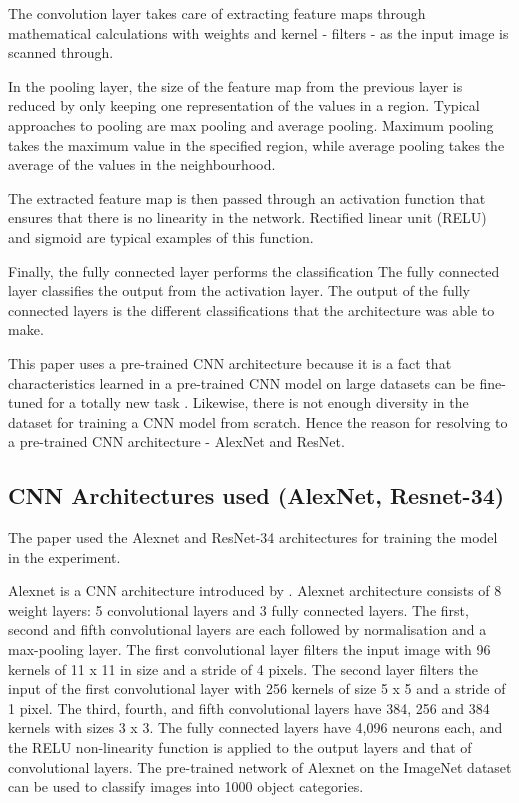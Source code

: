 \documentclass[conference]{IEEEtran}
\begin{document}
The convolution layer takes care of extracting feature maps through mathematical calculations with weights and kernel - filters - as the input image is scanned through. 

In the pooling layer, the size of the feature map from the previous layer is reduced by only keeping one representation of the values in a region. Typical approaches to pooling are max pooling and average pooling. Maximum pooling takes the maximum value in the specified region, while average pooling takes the average of the values in the neighbourhood.

The extracted feature map is then passed through an activation function that ensures that there is no linearity in the network. Rectified linear unit (RELU) and sigmoid are typical examples of this function.

Finally, the fully connected layer performs the classification 
The fully connected layer classifies the output from the activation layer. The output of the fully connected layers is the different classifications that the architecture was able to make.

This paper uses a pre-trained CNN architecture because it is a fact that characteristics learned in a pre-trained CNN model on large datasets can be fine-tuned for a totally new task \cite{}. Likewise, there is not enough diversity in the dataset for training a CNN model from scratch. Hence the reason for resolving to a pre-trained CNN architecture - AlexNet and ResNet. 


\subsection{CNN Architectures used (AlexNet, Resnet-34)}
The paper used the Alexnet and ResNet-34 architectures for training the model in the experiment.

Alexnet is a CNN architecture introduced by \cite{krizhevsky2012imagenet}. Alexnet architecture consists of 8 weight layers: 5 convolutional layers and 3 fully connected layers. The first, second and fifth convolutional layers are each followed by normalisation and a max-pooling layer. The first convolutional layer filters the input image with 96 kernels of 11 x 11 in size and a stride of 4 pixels. The second layer filters the input of the first convolutional layer with 256 kernels of size 5 x 5 and a stride of 1 pixel. The third, fourth, and fifth convolutional layers have 384, 256 and 384 kernels with sizes 3 x 3. The fully connected layers have 4,096 neurons each, and the RELU non-linearity function is applied to the output layers and that of convolutional layers.
The pre-trained network of Alexnet on the ImageNet dataset can be used to classify images into 1000 object categories.
\end{document}
